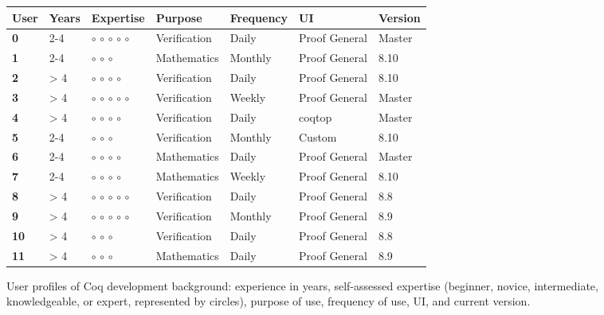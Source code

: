 \begin{figure} %
\begin{minipage}{0.67\textwidth}
\small
\centering
\begin{tabular}{ |l|l|l|l|l|l|l| }
 \hline
  \textbf{User} & \textbf{Years} & \textbf{Expertise} & \textbf{Purpose} & \textbf{Frequency} & \textbf{UI} & \textbf{Version} \\
\hline
  \textbf{0} & 2-4 & $\circ$ $\circ$ $\circ$ $\circ$ $\circ$ & Verification & Daily & Proof General & Master \\
  \textbf{1} & 2-4 & $\circ$ $\circ$ $\circ$ & Mathematics & Monthly & Proof General & 8.10 \\
  \textbf{2} & > 4 & $\circ$ $\circ$ $\circ$ $\circ$ & Verification & Daily & Proof General & 8.10 \\
  \textbf{3} & > 4 & $\circ$ $\circ$ $\circ$ $\circ$ $\circ$ & Verification & Weekly & Proof General & Master \\
  \textbf{4} & > 4 & $\circ$ $\circ$ $\circ$ $\circ$ & Verification & Daily & coqtop & Master \\
  \textbf{5} & 2-4 & $\circ$ $\circ$ $\circ$ & Verification & Monthly & Custom & 8.10 \\
  \textbf{6} & 2-4 & $\circ$ $\circ$ $\circ$ $\circ$ & Mathematics & Daily & Proof General & Master \\
  \textbf{7} & 2-4 & $\circ$ $\circ$ $\circ$ $\circ$ & Mathematics & Weekly & Proof General & 8.10 \\
  \textbf{8} & > 4 & $\circ$ $\circ$ $\circ$ $\circ$ $\circ$ & Verification & Daily & Proof General & 8.8 \\
  \textbf{9} & > 4 & $\circ$ $\circ$ $\circ$ $\circ$ $\circ$ & Verification & Monthly & Proof General & 8.9 \\
  \textbf{10} & > 4 & $\circ$ $\circ$ $\circ$ & Verification & Daily & Proof General & 8.8 \\
  \textbf{11} & > 4 & $\circ$ $\circ$ $\circ$ & Mathematics & Daily & Proof General & 8.9 \\
\hline
\end{tabular}
\caption{User profiles of Coq development
background: experience in years, self-assessed expertise (beginner, novice, intermediate, knowledgeable, or expert, represented by circles), purpose of use, frequency of use, UI, and current version.}
\label{tab:users}
\end{minipage}
\hfill
\begin{minipage}{0.31\textwidth}
\small

\end{minipage}
\end{figure}
